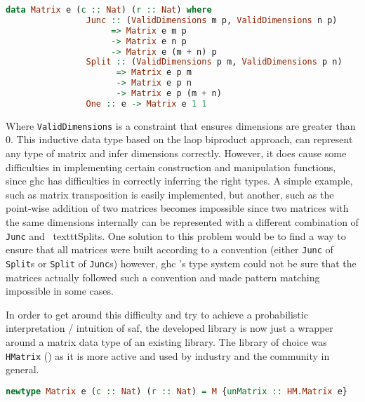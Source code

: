 \documentclass[
  oneside,
  11pt, a4paper,
  footinclude=true,
  headinclude=true,
  cleardoublepage=empty
]{scrbook}
\theoremstyle{definition}
\theoremstyle{definition}
\begin{document}
        \begin{lstlisting}[language=Haskell, caption={Inductive matrix definition},captionpos=b]
            data Matrix e (c :: Nat) (r :: Nat) where
                Junc :: (ValidDimensions m p, ValidDimensions n p) 
                     => Matrix e m p 
                     -> Matrix e n p 
                     -> Matrix e (m + n) p
                Split :: (ValidDimensions p m, ValidDimensions p n) 
                      => Matrix e p m 
                      -> Matrix e p n 
                      -> Matrix e p (m + n)
                One :: e -> Matrix e 1 1
        \end{lstlisting}{}
        
        Where \texttt{ValidDimensions} is a constraint that ensures dimensions are greater than 0. This inductive data type based on the \gls{laop} biproduct approach, can represent any type of matrix and infer dimensions correctly. However, it does cause some difficulties in implementing certain construction and manipulation functions, since \gls{ghc} has difficulties in correctly inferring the right types. A simple example, such as matrix transposition is easily implemented, but another, such as the point-wise addition of two matrices becomes impossible since two matrices with the same dimensions internally can be represented with a different combination of \texttt{Junc} and \ texttt{Split}s. One solution to this problem would be to find a way to ensure that all matrices were built according to a convention (either \texttt{Junc} of \texttt{Split}s or \texttt {Split} of \texttt{Junc}s) however, \gls{ghc} 's type system could not be sure that the matrices actually followed such a convention and made pattern matching impossible in some cases.
	    
	    In order to get around this difficulty and try to achieve a probabilistic interpretation / intuition of \gls{saf}, the developed library is now just a wrapper around a matrix data type of an existing library. The library of choice was \texttt{HMatrix} (\cite{hmatrix}) as it is more active and used by industry and the community in general.
	    
        \begin{lstlisting}[language=Haskell, label={lst:m-type-2}, caption={Type safe wrapper around HMatrix},captionpos=b]
        newtype Matrix e (c :: Nat) (r :: Nat) = M {unMatrix :: HM.Matrix e}
        \end{lstlisting}{}
        
\end{document}
